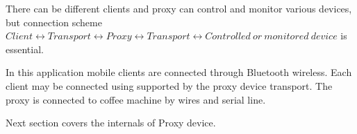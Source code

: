 There can be different clients and proxy can control and monitor various
devices, but connection scheme 
\(
{Client}\leftrightarrow{Transport}\leftrightarrow{Proxy}\leftrightarrow{Transport}\leftrightarrow{{Controlled~
or~monitored~device}} \)  is essential.

In this application mobile clients are connected through Bluetooth wireless. 
Each client may be connected using supported by the proxy device transport.
The proxy is connected to coffee machine by wires and serial line. 

Next section covers the internals of Proxy device.

